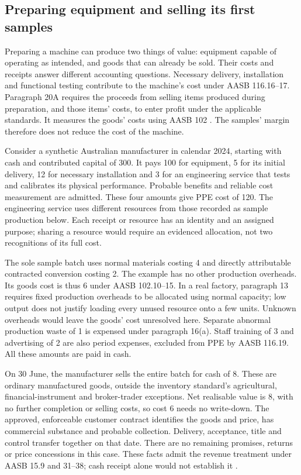 \subsection{Preparing equipment and selling its first samples}
\label{sec:ppe-pre-use-cost}

Preparing a machine can produce two things of value: equipment capable of
operating as intended, and goods that can already be sold. Their costs and
receipts answer different accounting questions. Necessary delivery,
installation and functional testing contribute to the machine's cost under
AASB 116.16--17. Paragraph 20A requires the proceeds from selling items
produced during preparation, and those items' costs, to enter profit under
the applicable standards. It measures the goods' costs using AASB 102
\citep{aasb116dated,aasb102compiled2021}. The samples' margin therefore does
not reduce the cost of the machine.

Consider a synthetic Australian manufacturer in calendar 2024, starting with
cash and contributed capital of 300. It pays 100 for equipment, 5 for its
initial delivery, 12 for necessary installation and 3 for an engineering
service that tests and calibrates its physical performance. Probable benefits
and reliable cost measurement are admitted. These four amounts give PPE cost
of 120. The engineering service uses different resources from those recorded
as sample production below. Each receipt or resource has an identity and an
assigned purpose; sharing a resource would require an evidenced allocation,
not two recognitions of its full cost.

The sole sample batch uses normal materials costing 4 and directly attributable
contracted conversion costing 2. The example has no other production
overheads. Its goods cost is thus 6 under AASB 102.10--15. In a real factory,
paragraph 13 requires fixed production overheads to be allocated using normal
capacity; low output does not justify loading every unused resource onto a
few units. Unknown overheads would leave the goods' cost unresolved here.
Separate abnormal production waste of 1 is expensed under paragraph 16(a).
Staff training of 3 and advertising of 2 are also period expenses, excluded
from PPE by AASB 116.19. All these amounts are paid in cash.

On 30 June, the manufacturer sells the entire batch for cash of 8. These are
ordinary manufactured goods, outside the inventory standard's agricultural,
financial-instrument and broker-trader exceptions. Net realisable value is 8,
with no further completion or selling costs, so cost 6 needs no write-down.
The approved, enforceable customer contract identifies the goods and price,
has commercial substance and probable collection. Delivery, acceptance, title
and control transfer together on that date. There are no remaining promises,
returns or price concessions in this case. These facts admit the revenue
treatment under AASB 15.9 and 31--38; cash receipt alone would not establish it
\citep{aasb15dated}.

